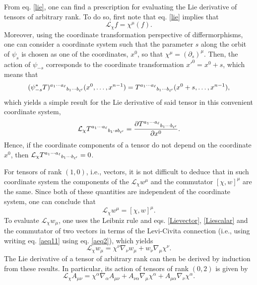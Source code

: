 \documentclass[
12pt,		%
openright,	%
twoside,  %
a4paper,			%
chapter=TITLE,		%
english,			%
french,				%
spanish,			%
brazil				%
]{USPSC-classe/USPSC}
\begin{document}
\begin{apendicesenv}
From eq. \ref{lie}, one can find a prescription for evaluating the Lie derivative of tensors of arbitrary rank. To do so, first note that eq. \ref{lie} implies that
\begin{equation}\label{Liescalar}
    \mathcal{L}_{\chi}f=\chi^{\mu}(f).
\end{equation}
Moreover, using the coordinate transformation perspective of differmorphisms, one can consider a coordinate system such that the parameter $s$ along the orbit of $\psi_s$ is chosen as one of the coordinates, $x^0$, so that $\chi^{\mu}=(\partial_{s})^{\mu}$. Then, the action of $\psi_{-s}$ corresponds to the coordinate transformation $x'^0=x^0+s$, which means that
\begin{equation}
    (\psi_{-s}^*T)^{a_1\cdots a_{\ell}}\mathstrut_{b_1\cdots b_{\ell'}}(x^0,\ldots,x^{n-1})=T^{a_1\cdots a_{\ell}}\mathstrut_{b_1\cdots b_{\ell'}}(x^0+s,\ldots,x^{n-1}),
\end{equation}
which yields a simple result for the Lie derivative of said tensor in this convenient coordinate system,
\begin{equation}
    \mathcal{L}_{\chi}T^{a_1\cdots a_{\ell}}\mathstrut_{b_1\cdot sb_{\ell'}}=\frac{\partial T^{a_1\cdots a_{\ell}}\mathstrut_{b_1\cdots b_{\ell'}}}{\partial x^{0}}.
\end{equation}
Hence, if the coordinate components of a tensor do not depend on the coordinate $x^0$, then $\mathcal{L}_{\chi}T^{a_1\cdots a_{\ell}}\mathstrut_{b_1\cdots b_{\ell'}}=0$. 

For tensors of rank $(1,0)$, i.e., vectors, it is not difficult to deduce that in such coordinate system the components of the $\mathcal{L}_{\chi}w^{\mu}$ and the commutator $[\chi,w]^{\mu}$ are the same. Since both of these quantities are independent of the coordinate system, one can conclude that 
\begin{equation}\label{Lievector}
    \mathcal{L}_{\chi}w^{\mu}=[\chi,w]^{\mu}.
\end{equation}
To evaluate $\mathcal{L}_{\chi}w_{\mu}$, one uses the Leibniz rule and eqs. \ref{Lievector}, \ref{Liescalar} and the commutator of two vectors in terms of the Levi-Civita connection  (i.e., using writing eq. \ref{aeq11} using eq. \ref{aeq2}), which yields
\begin{equation}\label{Lieform}
    \mathcal{L}_{\chi}w_{\mu}=\chi^{\nu}\nabla_{\nu}w_{\mu}+w_{\nu}\nabla_{\mu}\chi^{\nu}.
\end{equation}
The Lie derivative of a tensor of arbitrary rank can then be derived by induction from these results. In particular, its action of tensors of rank $(0,2)$ is given by
\begin{equation}\label{Liemetric}
    \mathcal{L}_{\chi}A_{\mu\nu}=\chi^{\alpha}\nabla_{\alpha}A_{\mu\nu}+A_{\nu\alpha}\nabla_{\mu}\chi^{\alpha}+A_{\mu\alpha}\nabla_{\nu}\chi^{\alpha}.
\end{equation}


\end{apendicesenv}
\end{document}
